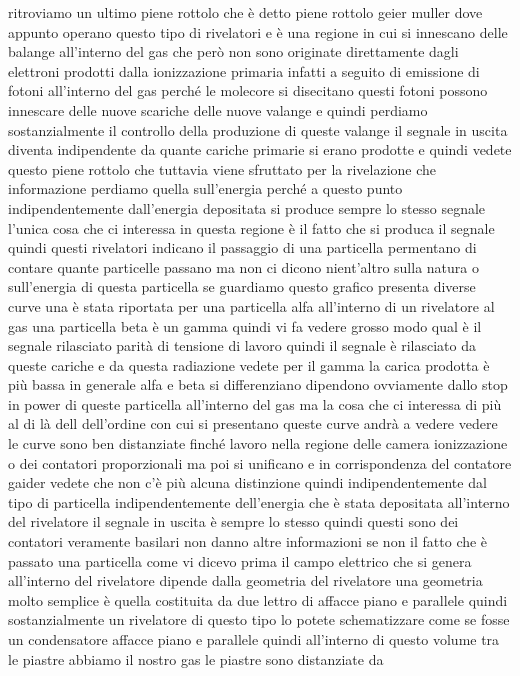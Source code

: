 ritroviamo un ultimo piene rottolo che è detto piene rottolo geier muller dove appunto operano questo tipo di rivelatori e è una regione in cui si innescano delle balange all'interno del gas che però non sono originate direttamente dagli elettroni prodotti dalla ionizzazione primaria infatti a seguito di emissione di fotoni all'interno del gas perché le molecore si disecitano questi fotoni possono innescare delle nuove scariche delle nuove valange e quindi perdiamo sostanzialmente il controllo della produzione di queste valange il segnale in uscita diventa indipendente da quante cariche primarie si erano prodotte e quindi vedete questo piene rottolo che tuttavia viene sfruttato per la rivelazione che informazione perdiamo quella sull'energia perché a questo punto indipendentemente dall'energia depositata si produce sempre lo stesso segnale l'unica cosa che ci interessa in questa regione è il fatto che si produca il segnale quindi questi rivelatori indicano il passaggio di una particella permentano di contare quante particelle passano ma non ci dicono nient'altro sulla natura o sull'energia di questa particella se guardiamo questo grafico presenta diverse curve una è stata riportata per una particella alfa all'interno di un rivelatore al gas una particella beta è un gamma quindi vi fa vedere grosso modo qual è il segnale rilasciato parità di tensione di lavoro quindi il segnale è rilasciato da queste cariche e da questa radiazione vedete per il gamma la carica prodotta è più bassa in generale alfa e beta si differenziano dipendono ovviamente dallo stop in power di queste particella all'interno del gas ma la cosa che ci interessa di più al di là dell dell'ordine con cui si presentano queste curve andrà a vedere vedere le curve sono ben distanziate finché lavoro nella regione delle camera ionizzazione o dei contatori proporzionali ma poi si unificano e in corrispondenza del contatore gaider vedete che non c'è più alcuna distinzione quindi indipendentemente dal tipo di particella indipendentemente dell'energia che è stata depositata all'interno del rivelatore il segnale in uscita è sempre lo stesso quindi questi sono dei contatori veramente basilari non danno altre informazioni se non il fatto che è passato una particella come vi dicevo prima il campo elettrico che si genera all'interno del rivelatore dipende dalla geometria del rivelatore una geometria molto semplice è quella costituita da due lettro di affacce piano e parallele quindi sostanzialmente un rivelatore di questo tipo lo potete schematizzare come se fosse un condensatore affacce piano e parallele quindi all'interno di questo volume tra le piastre abbiamo il nostro gas le piastre sono distanziate da 

